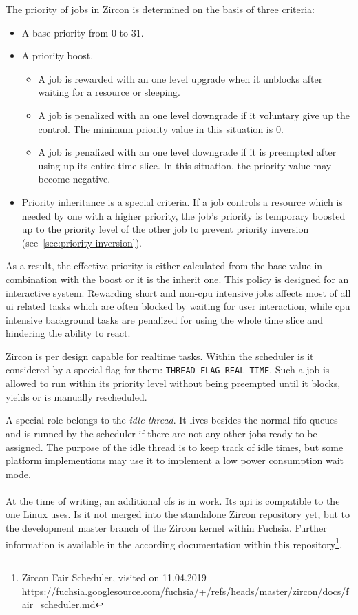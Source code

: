 The priority of jobs in Zircon is determined on the basis of three criteria:
\begin{itemize}
    \item A base priority from 0 to 31.
    \item A priority boost. 
        \begin{itemize}
            \item A job is rewarded with an one level upgrade when it unblocks after waiting for a resource or sleeping. 
            \item A job is penalized with an one level downgrade if it voluntary give up the control. The minimum priority value in this situation is 0.
            \item A job is penalized with an one level downgrade if it is preempted after using up its entire time slice. In this situation, the priority value may become negative.
        \end{itemize}
    \item Priority inheritance is a special criteria. If a job controls a resource which is needed by one with a higher priority, the job's priority is temporary boosted up to the priority level of the other job to prevent priority inversion (see~\ref{sec:priority-inversion}). 
\end{itemize}
As a result, the effective priority is either calculated from the base value in combination with the boost or it is the inherit one\cite{zircon-scheduling}.
This policy is designed for an interactive system.
Rewarding short and non-\ac{cpu} intensive jobs affects most of all \ac{ui} related tasks which are often blocked by waiting for user interaction, while \ac{cpu} intensive background tasks are penalized for using the whole time slice and hindering the ability to react.

Zircon is per design capable for realtime tasks.
Within the scheduler is it considered by a special flag for them: \texttt{THREAD\_FLAG\_REAL\_TIME}.
Such a job is allowed to run within its priority level without being preempted until it blocks, yields or is manually rescheduled\cite{zircon-scheduling}.

A special role belongs to the \textit{idle thread}.
It lives besides the normal \ac{fifo} queues and is runned by the scheduler if there are not any other jobs ready to be assigned.
The purpose of the idle thread is to keep track of idle times, but some platform implementions may use it to implement a low power consumption wait mode\cite{zircon-scheduling}.\\
\\
At the time of writing, an additional \ac{cfs} is in work.
Its \ac{api} is compatible to the one Linux uses.
Is it not merged into the standalone Zircon repository yet, but to the development master branch of the Zircon kernel within Fuchsia.
Further information is available in the according documentation within this repository\footnote{Zircon Fair Scheduler, visited on 11.04.2019 \url{https://fuchsia.googlesource.com/fuchsia/+/refs/heads/master/zircon/docs/fair_scheduler.md}}.


